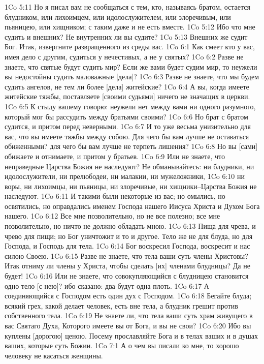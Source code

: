 1Co 5:11  Но я писал вам не сообщаться с тем, кто, называясь братом, остается блудником, или лихоимцем, или идолослужителем, или злоречивым, или пьяницею, или хищником; с таким даже и не есть вместе.
1Co 5:12  Ибо что мне судить и внешних? Не внутренних ли вы судите?
1Co 5:13  Внешних же судит Бог. Итак, извергните развращенного из среды вас.
1Co 6:1  Как смеет кто у вас, имея дело с другим, судиться у нечестивых, а не у святых?
1Co 6:2  Разве не знаете, что святые будут судить мир? Если же вами будет судим мир, то неужели вы недостойны судить маловажные [дела]?
1Co 6:3  Разве не знаете, что мы будем судить ангелов, не тем ли более [дела] житейские?
1Co 6:4  А вы, когда имеете житейские тяжбы, поставляете [своими судьями] ничего не значащих в церкви.
1Co 6:5  К стыду вашему говорю: неужели нет между вами ни одного разумного, который мог бы рассудить между братьями своими?
1Co 6:6  Но брат с братом судится, и притом перед неверными.
1Co 6:7  И то уже весьма унизительно для вас, что вы имеете тяжбы между собою. Для чего бы вам лучше не оставаться обиженными? для чего бы вам лучше не терпеть лишения?
1Co 6:8  Но вы [сами] обижаете и отнимаете, и притом у братьев.
1Co 6:9  Или не знаете, что неправедные Царства Божия не наследуют? Не обманывайтесь: ни блудники, ни идолослужители, ни прелюбодеи, ни малакии, ни мужеложники,
1Co 6:10  ни воры, ни лихоимцы, ни пьяницы, ни злоречивые, ни хищники--Царства Божия не наследуют.
1Co 6:11  И такими были некоторые из вас; но омылись, но освятились, но оправдались именем Господа нашего Иисуса Христа и Духом Бога нашего.
1Co 6:12  Все мне позволительно, но не все полезно; все мне позволительно, но ничто не должно обладать мною.
1Co 6:13  Пища для чрева, и чрево для пищи; но Бог уничтожит и то и другое. Тело же не для блуда, но для Господа, и Господь для тела.
1Co 6:14  Бог воскресил Господа, воскресит и нас силою Своею.
1Co 6:15  Разве не знаете, что тела ваши суть члены Христовы? Итак отниму ли члены у Христа, чтобы сделать [их] членами блудницы? Да не будет!
1Co 6:16  Или не знаете, что совокупляющийся с блудницею становится одно тело [с нею]? ибо сказано: два будут одна плоть.
1Co 6:17  А соединяющийся с Господом есть один дух с Господом.
1Co 6:18  Бегайте блуда; всякий грех, какой делает человек, есть вне тела, а блудник грешит против собственного тела.
1Co 6:19  Не знаете ли, что тела ваши суть храм живущего в вас Святаго Духа, Которого имеете вы от Бога, и вы не свои?
1Co 6:20  Ибо вы куплены [дорогою] ценою. Посему прославляйте Бога и в телах ваших и в душах ваших, которые суть Божии.
1Co 7:1  А о чем вы писали ко мне, то хорошо человеку не касаться женщины.
